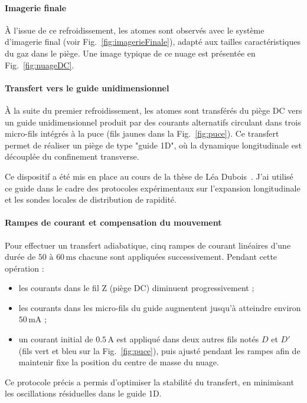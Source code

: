\paragraph{Imagerie finale}
À l’issue de ce refroidissement, les atomes sont observés avec le système d’imagerie final (voir Fig.~\ref{fig:imagerieFinale}), adapté aux tailles caractéristiques du gaz dans le piège. Une image typique de ce nuage est présentée en Fig.~\ref{fig:nuageDC}.

\paragraph{Transfert vers le guide unidimensionnel}
À la suite du premier refroidissement, les atomes sont transférés du piège DC vers un guide unidimensionnel produit par des courants alternatifs circulant dans trois micro-fils intégrés à la puce (fils jaunes dans la Fig.~\ref{fig:puce}). Ce transfert permet de réaliser un piège de type "guide 1D", où la dynamique longitudinale est découplée du confinement transverse.

Ce dispositif a été mis en place au cours de la thèse de Léa Dubois~\cite{TheseLea}. J’ai utilisé ce guide dans le cadre des protocoles expérimentaux sur l’expansion longitudinale et les sondes locales de distribution de rapidité.

\paragraph{Rampes de courant et compensation du mouvement}
Pour effectuer un transfert adiabatique, cinq rampes de courant linéaires d'une durée de \( 50 \text{ à } 60\,\mathrm{ms} \) chacune sont appliquées successivement. Pendant cette opération :
\begin{itemize}
    \item les courants dans le fil Z (piège DC) diminuent progressivement ;
    \item les courants dans les micro-fils du guide augmentent jusqu’à atteindre environ \( 50\,\mathrm{mA} \) ;
    \item un courant initial de \( 0.5\,\mathrm{A} \) est appliqué dans deux autres fils notés \( D \) et \( D' \) (fils vert et bleu sur la Fig.~\ref{fig:puce}), puis ajusté pendant les rampes afin de maintenir fixe la position du centre de masse du nuage.
\end{itemize}

Ce protocole précis a permis d’optimiser la stabilité du transfert, en minimisant les oscillations résiduelles dans le guide 1D.

